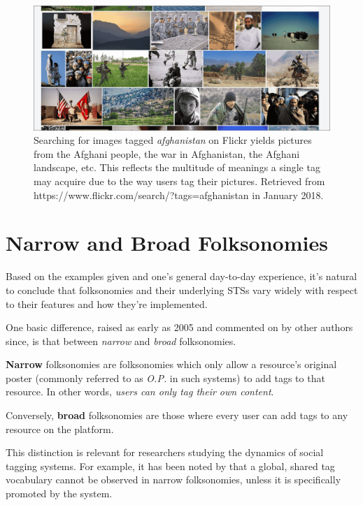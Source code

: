 \begin{figure}[H]
    \centering
    \includegraphics[width=\textwidth]{chapters/02_social_tagging/images/flickr_afghanistan.png}
    \caption{Searching for images tagged \textit{afghanistan} on Flickr yields pictures from the Afghani people, the war in Afghanistan, the Afghani landscape, etc. This reflects the multitude of meanings a single tag may acquire due to the way users tag their pictures. Retrieved from https://www.flickr.com/search/?tags=afghanistan in January 2018.}
    \label{fig:afghanistan}
\end{figure}

\section{Narrow and Broad Folksonomies}

Based on the examples given and one's general day-to-day experience, it's natural to conclude that folksonomies and their underlying STSs vary widely with respect to their features and how they're implemented.

One basic difference, raised as early as 2005 \citep{wal_2005_broad_and_narrow} and commented on by other authors \citep{marlow_etal_2006,halpin_etal_2006,peters_2009} since, is that between \textit{narrow} and \textit{broad} folksonomies.

\textbf{Narrow} folksonomies are folksonomies which only allow a resource's original poster (commonly referred to as \textit{O.P.} in such systems) to add tags to that resource. In other words, \textit{users can only tag their own content}.

Conversely, \textbf{broad} folksonomies are those where every user can add tags to any resource on the platform.

This distinction is relevant for researchers studying the dynamics of social tagging systems. For example, it has been noted by \cite{schifanella_etal_2010} that a global, shared tag vocabulary cannot be observed in narrow folksonomies, unless it is specifically promoted by the system.

